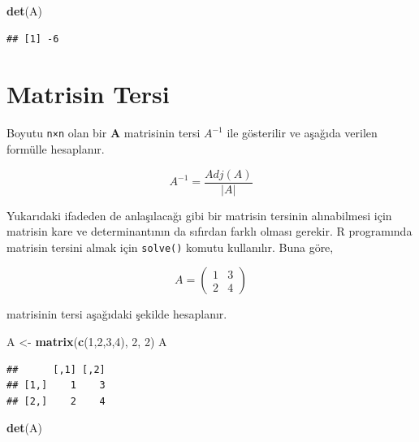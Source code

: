 \documentclass[
]{book}
\newenvironment{Shaded}{\begin{snugshade}}{\end{snugshade}}
\newcommand{\DecValTok}[1]{\textcolor[rgb]{0.00,0.00,0.81}{#1}}
\newcommand{\FunctionTok}[1]{\textcolor[rgb]{0.13,0.29,0.53}{\textbf{#1}}}
\newcommand{\NormalTok}[1]{#1}
\newcommand{\OtherTok}[1]{\textcolor[rgb]{0.56,0.35,0.01}{#1}}
\begin{document}
\begin{Shaded}
\begin{Highlighting}[]
 \FunctionTok{det}\NormalTok{(A)}
\end{Highlighting}
\end{Shaded}

\begin{verbatim}
## [1] -6
\end{verbatim}

\section{Matrisin Tersi}\label{matrisin-tersi}

Boyutu \texttt{n×n} olan bir \textbf{A} matrisinin tersi \(A^{-1}\) ile gösterilir ve aşağıda verilen formülle hesaplanır.

\[
 A^{-1}=
 \frac{Adj(A)}{|A|}
\]

Yukarıdaki ifadeden de anlaşılacağı gibi bir matrisin tersinin alınabilmesi için matrisin kare ve determinantının da sıfırdan farklı olması gerekir. R programında matrisin tersini almak için \texttt{solve()} komutu kullanılır. Buna göre,

\[A=
\begin{pmatrix}
 1 & 3 \\
 2 & 4 
\end{pmatrix}\]

matrisinin tersi aşağıdaki şekilde hesaplanır.

\begin{Shaded}
\begin{Highlighting}[]
\NormalTok{ A }\OtherTok{\textless{}{-}} \FunctionTok{matrix}\NormalTok{(}\FunctionTok{c}\NormalTok{(}\DecValTok{1}\NormalTok{,}\DecValTok{2}\NormalTok{,}\DecValTok{3}\NormalTok{,}\DecValTok{4}\NormalTok{), }\DecValTok{2}\NormalTok{, }\DecValTok{2}\NormalTok{) }
\NormalTok{ A }
\end{Highlighting}
\end{Shaded}

\begin{verbatim}
##      [,1] [,2]
## [1,]    1    3
## [2,]    2    4
\end{verbatim}

\begin{Shaded}
\begin{Highlighting}[]
 \FunctionTok{det}\NormalTok{(A)}
\end{Highlighting}
\end{Shaded}
\end{document}
